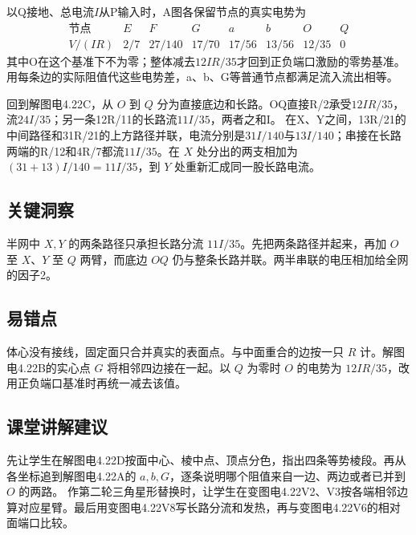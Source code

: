 \documentclass[UTF8,fontset=fandol,a4paper,11pt]{ctexart}
\begin{document}
以Q接地、总电流$I$从P输入时，A图各保留节点的真实电势为
\[
\begin{array}{c|rrrrrrr}
\text{节点}&E&F&G&a&b&O&Q\\ \hline
V/(IR)&2/7&27/140&17/70&17/56&13/56&12/35&0
\end{array}
\]
其中O在这个基准下不为零；整体减去$12IR/35$才回到正负端口激励的零势基准。用每条边的实际阻值代这些电势差，a、b、G等普通节点都满足流入流出相等。

回到解图电4.22C，从 $O$ 到 $Q$ 分为直接底边和长路。OQ直接R/2承受$12IR/35$，流$24I/35$；另一条12R/11的长路流$11I/35$，两者之和I。
在X、Y之间，13R/21的中间路径和31R/21的上方路径并联，电流分别是$31I/140$与$13I/140$；串接在长路两端的R/12和4R/7都流$11I/35$。在 $X$ 处分出的两支相加为 $(31+13)I/140=11I/35$，到 $Y$ 处重新汇成同一股长路电流。




\subsection*{关键洞察}

半网中 $X,Y$ 的两条路径只承担长路分流 $11I/35$。先把两条路径并起来，再加 $O$ 至 $X$、$Y$ 至 $Q$ 两臂，而底边 $OQ$ 仍与整条长路并联。两半串联的电压相加给全网的因子2。



\subsection*{易错点}

体心没有接线，固定面只合并真实的表面点。与中面重合的边按一只 $R$ 计。解图电4.22B的实心点 $G$ 将相邻四边接在一起。以 $Q$ 为零时 $O$ 的电势为 $12IR/35$，改用正负端口基准时再统一减去该值。



\subsection*{课堂讲解建议}

先让学生在解图电4.22D按面中心、棱中点、顶点分色，指出四条等势棱段。再从各坐标追到解图电4.22A的 $a,b,G$，逐条说明哪个阻值来自一边、两边或者已并到 $O$ 的两路。
作第二轮三角星形替换时，让学生在变图电4.22V2、V3按各端相邻边算对应星臂。最后用变图电4.22V8写长路分流和发热，再与变图电4.22V6的相对面端口比较。
\end{document}
